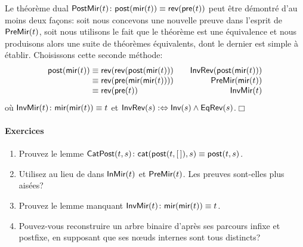 Le théorème dual \(\textsf{PostMir}({t})
\colon \textsf{post}(\textsf{mir}(t)) \equiv
\textsf{rev}(\textsf{pre}(t))\)
 
 peut être démontré d'au moins deux façons:
soit nous concevons une nouvelle preuve dans l'esprit de
\(\textsf{PreMir}({t})\), soit nous utilisons le fait que le théorème est
une équivalence et nous produisons alors une suite de théorèmes
équivalents, dont le dernier est simple à établir. Choisissons cette
seconde méthode:
\begin{equation*}
  \begin{array}{@{}r@{\;}c@{\;}l@{\qquad}r@{}}
    \fun{post}(\fun{mir}(t))
    & \equiv
    & \fun{rev}(\fun{rev}(\fun{post}(\fun{mir}(t)))
    & \IH{\pred{InvRev}{\fun{post}(\fun{mir}(t))}}\\
    & \equiv
    & \fun{rev}(\fun{pre}(\fun{mir}(\fun{mir}(t))))
    & \IH{\pred{PreMir}{\fun{mir}(t)}}\\
    & \equiv
    & \fun{rev}(\fun{pre}(t))
    & \IH{\pred{InvMir}{t}}
  \end{array}
\end{equation*}
où \(\textsf{InvMir}({t}) \colon
\textsf{mir}(\textsf{mir}(t)) \equiv t\) et
\(\textsf{InvRev}({s}) :\Leftrightarrow \textsf{Inv}({s}) \wedge
\textsf{EqRev}({s})\).\hfill\(\Box\)

\paragraph{Exercices}
\nopagebreak
\begin{enumerate}

  \item Prouvez le lemme
  \(\textsf{CatPost}({t,s}) \colon \textsf{cat}(\textsf{post}(t,[\,]),s) \equiv
  \textsf{post}(t,s)\).

  \item Utilisez  au lieu de  dans
  \(\textsf{InMir}({t})\) et \(\textsf{PreMir}({t})\). Les preuves sont-elles
  plus aisées?

  \item Prouvez le lemme manquant
  \(\textsf{InvMir}({t}) \colon \textsf{mir}(\textsf{mir}(t)) \equiv
  t\).\label{ex_mir_mir}

\item Pouvez-vous reconstruire un arbre binaire d'après ses parcours
  infixe et postfixe, en supposant que ses nœuds internes sont
  tous distincts?

\end{enumerate}

